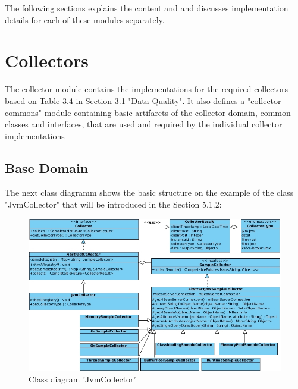 The following sections explains the content and and discusses implementation details for each of these modules separately.

\section{Collectors}
\label{sec:impl-collectors}

The collector module contains the implementations for the required collectors based on Table 3.4 in
Section 3.1 "Data Quality". It also defines a "collector-commons" module containing basic artifarcts
of the collector domain, common classes and interfaces, that are used and required by the individual
collector implementations

\subsection{Base Domain}

The next class diagramm shows the basic structure on the example of the class "JvmCollector" that will be introduced in
the Section 5.1.2:
\begin{figure}[H]
	\centering
	\includegraphics[width=1.0\textwidth]{../uml/class-jvm-collector.jpg}
	\caption{Class diagram 'JvmCollector'}
	\label{class-diagram-jvm-collector}
\end{figure}

